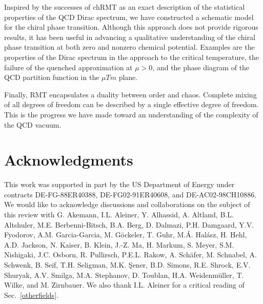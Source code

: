 Inspired by the successes of chRMT as an exact description of the
statistical properties of the QCD Dirac spectrum, we have constructed a
schematic model for the chiral phase transition.  Although this
approach does not provide rigorous results, it has been 
useful in advancing a qualitative understanding of the chiral phase
transition at both zero and nonzero chemical potential.  Examples are
the properties of the Dirac spectrum in the approach to the critical
temperature, the failure of the quenched approximation at $\mu>0$, and
the phase diagram of the QCD partition function in the $\mu Tm$ plane.
 
Finally, RMT encapsulates a duality between order and
chaos. Complete mixing of all degrees of freedom can be described by a
single effective degree of freedom. This is the progress we have
made toward an understanding of the complexity of the QCD vacuum.


\section*{Acknowledgments}

This work was supported in part by the US Department of Energy under
contracts DE-FG-88ER40388, DE-FG02-91ER40608, and DE-AC02-98CH10886.
We would like to acknowledge discussions and collaborations on the
subject of this review with G. Akemann, I.L. Aleiner, Y. Alhassid, A.
Altland, B.L.  Altshuler, M.E.  Berbenni-Bitsch, B.A. Berg, D.
Dalmazi, P.H.  Damgaard, Y.V.  Fyodorov, A.M. Garcia-Garcia, M.
G\"ockeler, T.  Guhr, M.\'A.  Hal\'asz, H. Hehl, A.D.  Jackson, N.
Kaiser, B. Klein, J.-Z. Ma, H.  Markum, S.  Meyer, S.M.  Nishigaki,
J.C.  Osborn, R.  Pullirsch, P.E.L. Rakow, A.  Sch\"afer, M.
Schnabel, A. Schwenk, B.  Seif, T.H.  Seligman, M.K.  \c Sener, B.D.
Simons, R.E.  Shrock, E.V.  Shuryak, A.V.  Smilga, M.A.  Stephanov, D.
Toublan, H.A.  Weidenm\"uller, T.  Wilke, and M.  Zirnbauer.  We also
thank I.L.  Aleiner for a critical reading of Sec.~\ref{otherfields}.

